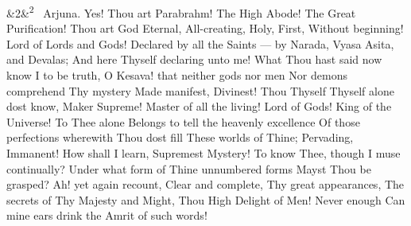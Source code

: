 \documentclass[12pt]{article}
\newcommand{\para}[1][]{\par\noindent\ifx&#1&\else\textsuperscript{\footnotesize #1}~\fi}
\begin{document}
\para[2] Arjuna. Yes! Thou art Parabrahm! The High Abode! The Great Purification! Thou art God Eternal, All-creating, Holy, First, Without beginning! Lord of Lords and Gods! Declared by all the Saints --- by Narada, Vyasa Asita, and Devalas; And here Thyself declaring unto me! What Thou hast said now know I to be truth, O Kesava! that neither gods nor men Nor demons comprehend Thy mystery Made manifest, Divinest! Thou Thyself Thyself alone dost know, Maker Supreme! Master of all the living! Lord of Gods! King of the Universe! To Thee alone Belongs to tell the heavenly excellence Of those perfections wherewith Thou dost fill These worlds of Thine; Pervading, Immanent! How shall I learn, Supremest Mystery! To know Thee, though I muse continually? Under what form of Thine unnumbered forms Mayst Thou be grasped? Ah! yet again recount, Clear and complete, Thy great appearances, The secrets of Thy Majesty and Might, Thou High Delight of Men! Never enough Can mine ears drink the Amrit of such words!
\end{document}
